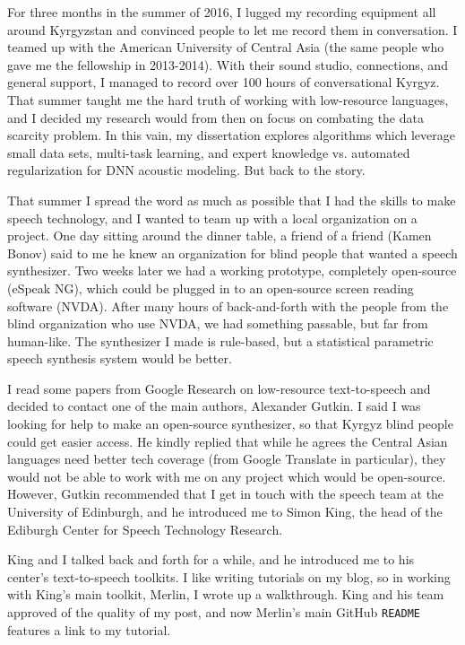\documentclass[12pt,a4paper]{article}
\begin{document}
For three months in the summer of 2016, I lugged my recording equipment all around Kyrgyzstan and convinced people to let me record them in conversation. I teamed up with the American University of Central Asia (the same people who gave me the fellowship in 2013-2014). With their sound studio, connections, and general support, I managed to record over 100 hours of conversational Kyrgyz. That summer taught me the hard truth of working with low-resource languages, and I decided my research would from then on focus on combating the data scarcity problem. In this vain, my dissertation explores algorithms which leverage small data sets, multi-task learning, and expert knowledge vs. automated regularization for DNN acoustic modeling. But back to the story.

That summer I spread the word as much as possible that I had the skills to make speech technology, and I wanted to team up with a local organization on a project. One day sitting around the dinner table, a friend of a friend (Kamen Bonov) said to me he knew an organization for blind people that wanted a speech synthesizer. Two weeks later we had a working prototype, completely open-source (eSpeak NG), which could be plugged in to an open-source screen reading software (NVDA). After many hours of back-and-forth with the people from the blind organization who use NVDA, we had something passable, but far from human-like. The synthesizer I made is rule-based, but a statistical parametric speech synthesis system would be better.

I read some papers from Google Research on low-resource text-to-speech and decided to contact one of the main authors, Alexander Gutkin. I said I was looking for help to make an open-source synthesizer, so that Kyrgyz blind people could get easier access. He kindly replied that while he agrees the Central Asian languages need better tech coverage (from Google Translate in particular), they would not be able to work with me on any project which would be open-source. However, Gutkin recommended that I get in touch with the speech team at the University of Edinburgh, and he introduced me to Simon King, the head of the Ediburgh Center for Speech Technology Research.

King and I talked back and forth for a while, and he introduced me to his center's text-to-speech toolkits. I like writing tutorials on my blog, so in working with King's main toolkit, Merlin, I wrote up a walkthrough. King and his team approved of the quality of my post, and now Merlin's main GitHub \texttt{README} features a link to my tutorial.
\end{document}
